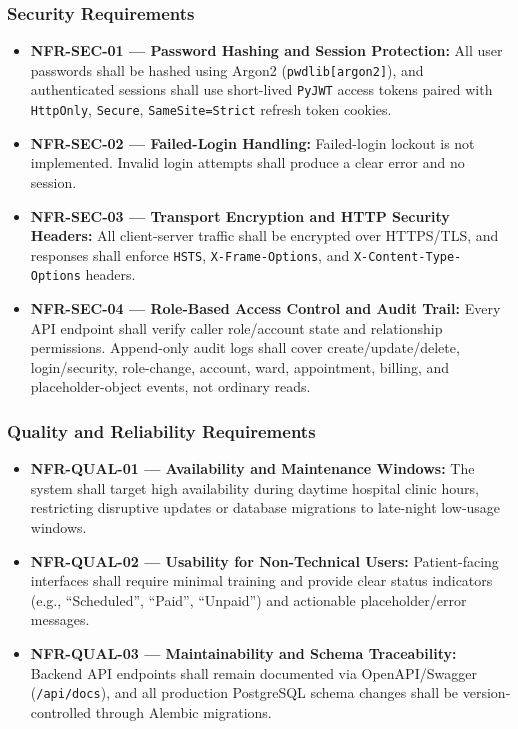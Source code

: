 \documentclass[11pt,a4paper]{article}
\begin{document}
\subsubsection{Security Requirements}
\begin{itemize}
    \item \textbf{NFR-SEC-01 — Password Hashing and Session Protection:} All user passwords shall be hashed using Argon2 (\texttt{pwdlib[argon2]}), and authenticated sessions shall use short-lived \texttt{PyJWT} access tokens paired with \texttt{HttpOnly}, \texttt{Secure}, \texttt{SameSite=Strict} refresh token cookies.
    \item \textbf{NFR-SEC-02 — Failed-Login Handling:} Failed-login lockout is not implemented. Invalid login attempts shall produce a clear error and no session.
    \item \textbf{NFR-SEC-03 — Transport Encryption and HTTP Security Headers:} All client-server traffic shall be encrypted over HTTPS/TLS, and responses shall enforce \texttt{HSTS}, \texttt{X-Frame-Options}, and \texttt{X-Content-Type-Options} headers.
    \item \textbf{NFR-SEC-04 — Role-Based Access Control and Audit Trail:} Every API endpoint shall verify caller role/account state and relationship permissions. Append-only audit logs shall cover create/update/delete, login/security, role-change, account, ward, appointment, billing, and placeholder-object events, not ordinary reads.
\end{itemize}

\subsubsection{Quality and Reliability Requirements}
\begin{itemize}
    \item \textbf{NFR-QUAL-01 — Availability and Maintenance Windows:} The system shall target high availability during daytime hospital clinic hours, restricting disruptive updates or database migrations to late-night low-usage windows.
    \item \textbf{NFR-QUAL-02 — Usability for Non-Technical Users:} Patient-facing interfaces shall require minimal training and provide clear status indicators (e.g., ``Scheduled'', ``Paid'', ``Unpaid'') and actionable placeholder/error messages.
    \item \textbf{NFR-QUAL-03 — Maintainability and Schema Traceability:} Backend API endpoints shall remain documented via OpenAPI/Swagger (\texttt{/api/docs}), and all production PostgreSQL schema changes shall be version-controlled through Alembic migrations.
\end{itemize}
\end{document}
